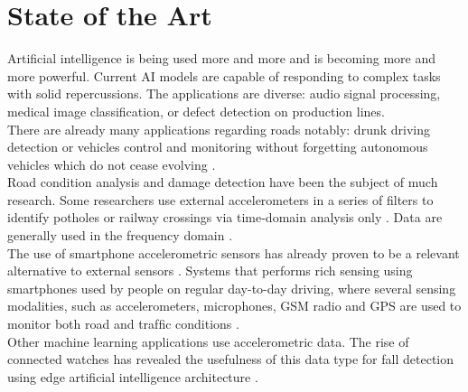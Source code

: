\section{State of the Art}
Artificial intelligence is being used more and more and is becoming more and more powerful. Current AI models are capable of responding to complex tasks with solid repercussions. The applications are diverse: audio signal processing, medical image classification, or defect detection on production lines.\\
There are already many applications regarding roads notably: drunk driving detection \cite{drunk_2}\cite{drunk_1} or vehicles control and monitoring \cite{xxii} without forgetting autonomous vehicles which do not cease evolving \cite{vehicle_1}.\\
Road condition analysis and damage detection have been the subject of much research. Some researchers use external accelerometers in a series of ﬁlters to identify potholes or railway crossings via time-domain analysis only \cite{road_4}\cite{road_5}. Data are generally used in the frequency domain \cite{road_2}\cite{road_1}.\\
The use of smartphone accelerometric sensors has already proven to be a relevant alternative to external sensors \cite{road_3}. Systems that performs rich sensing using smartphones used by people on regular day-to-day driving, where several sensing modalities, such as accelerometers, microphones, GSM radio and GPS are used to monitor both road and trafﬁc conditions \cite{road_6}.\\
Other machine learning applications use accelerometric data. The rise of connected watches has revealed the usefulness of this data type for fall detection \cite{fall_1} \cite{fall_2} using edge artificial intelligence architecture \cite{fall_3}.\\


